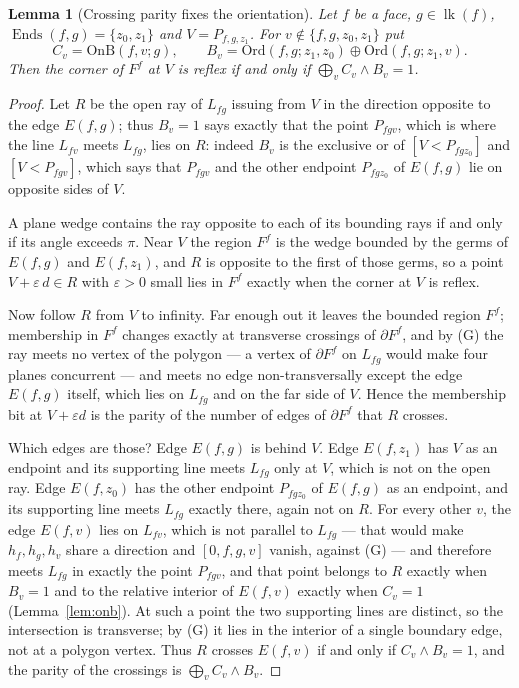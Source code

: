 \documentclass[11pt,reqno]{amsart}
\theoremstyle{plain}
\newtheorem{lemma}[theorem]{Lemma}
\theoremstyle{definition}
\newcommand{\bra}[1]{[#1]}
\newcommand{\Ends}{\operatorname{Ends}}
\newcommand{\link}{\operatorname{lk}}
\newcommand{\OnB}{\mathrm{OnB}}
\newcommand{\Ord}{\mathrm{Ord}}
\newcommand{\xor}{\oplus}
\begin{document}
\begin{lemma}[Crossing parity fixes the orientation]\label{lem:parity}
Let $f$ be a face, $g\in\link(f)$, $\Ends(f,g)=\{z_0,z_1\}$ and $V=P_{f,g,z_1}$. For
$v\notin\{f,g,z_0,z_1\}$ put
\[
   C_v=\OnB(f,v;g),\qquad B_v=\Ord(f,g;z_1,z_0)\xor\Ord(f,g;z_1,v).
\]
Then the corner of $F^f$ at $V$ is reflex if and only if $\bigoplus_{v} C_v\wedge B_v=1$.
\end{lemma}

\begin{proof}
Let $R$ be the open ray of $L_{fg}$ issuing from $V$ in the direction opposite to the edge $E(f,g)$;
thus $B_v=1$ says exactly that the point $P_{fgv}$, which is where the line $L_{fv}$ meets $L_{fg}$,
lies on $R$: indeed $B_v$ is the exclusive or of $[V<P_{fgz_0}]$ and $[V<P_{fgv}]$, which says that
$P_{fgv}$ and the other endpoint $P_{fgz_0}$ of $E(f,g)$ lie on opposite sides of $V$.

A plane wedge contains the ray opposite to each of its bounding rays if and only if its angle exceeds
$\pi$. Near $V$ the region $F^f$ is the wedge bounded by the germs of $E(f,g)$ and $E(f,z_1)$, and $R$
is opposite to the first of those germs, so a point $V+\varepsilon\,d\in R$ with $\varepsilon>0$ small
lies in $F^f$ exactly when the corner at $V$ is reflex.

Now follow $R$ from $V$ to infinity. Far enough out it leaves the bounded region $F^f$; membership in
$F^f$ changes exactly at transverse crossings of $\partial F^f$, and by (G) the ray meets no vertex of
the polygon --- a vertex of $\partial F^f$ on $L_{fg}$ would make four planes concurrent --- and meets
no edge non-transversally except the edge $E(f,g)$ itself, which lies on $L_{fg}$ and on the far side
of $V$. Hence the membership bit at $V+\varepsilon d$ is the parity of the number of edges of
$\partial F^f$ that $R$ crosses.

Which edges are those? Edge $E(f,g)$ is behind $V$. Edge $E(f,z_1)$ has $V$ as an endpoint and its
supporting line meets $L_{fg}$ only at $V$, which is not on the open ray. Edge $E(f,z_0)$ has the
other endpoint $P_{fgz_0}$ of $E(f,g)$ as an endpoint, and its supporting line meets $L_{fg}$ exactly
there, again not on $R$. For every other $v$, the edge $E(f,v)$ lies on $L_{fv}$, which is not parallel to $L_{fg}$ --- that
would make $h_f,h_g,h_v$ share a direction and $\bra{0,f,g,v}$ vanish, against (G) --- and therefore
meets $L_{fg}$ in exactly the point $P_{fgv}$, and that point belongs to $R$ exactly when $B_v=1$ and to the relative interior
of $E(f,v)$ exactly when $C_v=1$ (Lemma~\ref{lem:onb}). At such a point the two supporting lines
are distinct, so the intersection is transverse; by (G) it lies in the interior of a single
boundary edge, not at a polygon vertex. Thus $R$ crosses $E(f,v)$ if and only if
$C_v\wedge B_v=1$, and the parity of the crossings is $\bigoplus_v C_v\wedge B_v$.
\end{proof}
\end{document}
